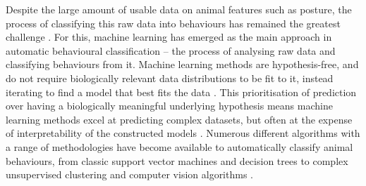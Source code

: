 \documentclass[11pt, letterpaper]{article} %
\begin{document}
    
    \noindent Despite the large amount of usable data on animal features such as posture, the process of classifying this raw data into behaviours has remained the greatest challenge \citep{hughey_challenges_2018}. For this, machine learning has emerged as the main approach in automatic behavioural classification -- the process of analysing raw data and classifying behaviours from it. Machine learning methods are hypothesis-free, and do not require biologically relevant data distributions to be fit to it, instead iterating to find a model that best fits the data \citep{ML_for_behaviour_2017}. This prioritisation of prediction over having a biologically meaningful underlying hypothesis means machine learning methods excel at predicting complex datasets, but often at the expense of interpretability of the constructed models \citep{ML_for_behaviour_2017}. Numerous different algorithms with a range of methodologies have become available to automatically classify animal behaviours, from classic support vector machines and decision trees \citep{bergen_review_2023} to complex unsupervised clustering \citep{hsu_b-soid_2021} and computer vision algorithms \citep{bohnslav_deepethogram_2021}. \\
\end{document}
